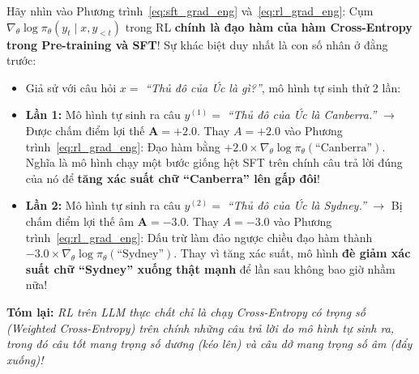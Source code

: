 \begin{mathdecode}
Hãy nhìn vào Phương trình~\eqref{eq:sft_grad_eng} và~\eqref{eq:rl_grad_eng}: Cụm $\nabla_\theta \log \pi_\theta(y_t \mid x, y_{<t})$ trong RL \textbf{chính là đạo hàm của hàm Cross-Entropy trong Pre-training và SFT}! Sự khác biệt duy nhất là con số nhân ở đằng trước:
\begin{itemize}[leftmargin=1.2cm]
    \item Giả sử với câu hỏi $x =$ \textit{``Thủ đô của Úc là gì?''}, mô hình tự sinh thử 2 lần:
    \item \textbf{Lần 1:} Mô hình tự sinh ra câu $y^{(1)} =$ \textit{``Thủ đô của Úc là Canberra.''} $\to$ Được chấm điểm lợi thế $\mathbf{A = +2.0}$.
    Thay $A = +2.0$ vào Phương trình~\eqref{eq:rl_grad_eng}: Đạo hàm bằng $+2.0 \times \nabla_\theta \log \pi_\theta(\text{``Canberra''})$. Nghĩa là mô hình chạy một bước giống hệt SFT trên chính câu trả lời đúng của nó để \textbf{tăng xác suất chữ ``Canberra'' lên gấp đôi}!
    \item \textbf{Lần 2:} Mô hình tự sinh ra câu $y^{(2)} =$ \textit{``Thủ đô của Úc là Sydney.''} $\to$ Bị chấm điểm lợi thế âm $\mathbf{A = -3.0}$.
    Thay $A = -3.0$ vào Phương trình~\eqref{eq:rl_grad_eng}: Dấu trừ làm đảo ngược chiều đạo hàm thành $-3.0 \times \nabla_\theta \log \pi_\theta(\text{``Sydney''})$. Thay vì tăng xác suất, mô hình \textbf{đè giảm xác suất chữ ``Sydney'' xuống thật mạnh} để lần sau không bao giờ nhầm nữa!
\end{itemize}
\textbf{Tóm lại:} \textit{RL trên LLM thực chất chỉ là chạy Cross-Entropy có trọng số (Weighted Cross-Entropy) trên chính những câu trả lời do mô hình tự sinh ra, trong đó câu tốt mang trọng số dương (kéo lên) và câu dở mang trọng số âm (đẩy xuống)!}
\end{mathdecode}

